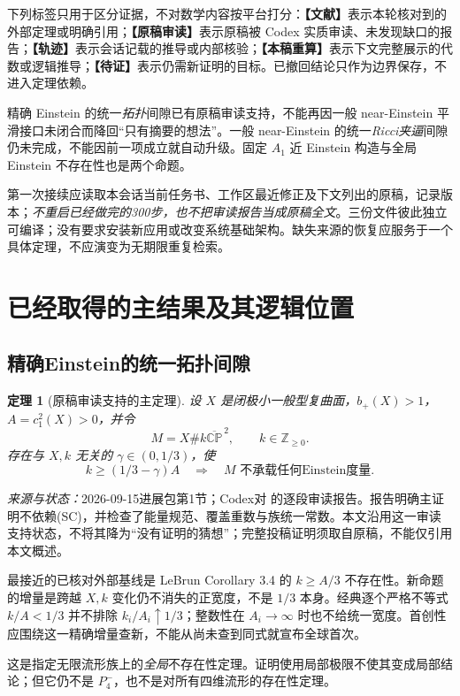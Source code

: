 \documentclass[UTF8,a4paper,11pt,fontset=fandol]{ctexart}
\numberwithin{equation}{section}
\newtheorem{theorem}{定理}[section]
\theoremstyle{definition}
\newcommand{\CP}{\mathbb{CP}}
\newcommand{\Z}{\mathbb Z}
\newcommand{\source}[1]{\par\noindent\textit{来源与状态：}#1\par}
\newcommand{\status}[1]{\textbf{【#1】}}
\begin{document}
下列标签只用于区分证据，不对数学内容按平台打分：\status{文献}表示本轮核对到的外部定理或明确引用；\status{原稿审读}表示原稿被 Codex 实质审读、未发现缺口的报告；\status{轨迹}表示会话记载的推导或内部核验；\status{本稿重算}表示下文完整展示的代数或逻辑推导；\status{待证}表示仍需新证明的目标。已撤回结论只作为边界保存，不进入定理依赖。

精确 Einstein 的统一\emph{拓扑}间隙已有原稿审读支持，不能再因一般 near-Einstein 平滑接口未闭合而降回“只有摘要的想法”。一般 near-Einstein 的统一\emph{Ricci夹逼}间隙仍未完成，不能因前一项成立就自动升级。固定 $A_1$ 近 Einstein 构造与全局 Einstein 不存在性也是两个命题。

第一次接续应读取本会话当前任务书、工作区最近修正及下文列出的原稿，记录版本；\emph{不重启已经做完的300步，也不把审读报告当成原稿全文}。三份文件彼此独立可编译；没有要求安装新应用或改变系统基础架构。缺失来源的恢复应服务于一个具体定理，不应演变为无期限重复检索。

\section{已经取得的主结果及其逻辑位置}
\subsection{精确Einstein的统一拓扑间隙}
\begin{theorem}[原稿审读支持的主定理]\label{thm:topgap}
设 $X$ 是闭极小一般型复曲面，$b_+(X)>1$，$A=c_1^2(X)>0$，并令
\[
M=X\#k\overline{\CP}^{\,2},\qquad k\in\Z_{\ge0}.
\]
存在与 $X,k$ 无关的 $\gamma\in(0,1/3)$，使
\begin{equation}\label{eq:topgap}
 k\ge(1/3-\gamma)A\quad\Longrightarrow\quad
 M\text{ 不承载任何Einstein度量}.
\end{equation}
\end{theorem}
\source{2026-09-15进展包第1节；Codex对  的逐段审读报告\cite{Project,CodexReview}。报告明确主证明不依赖(SC)，并检查了能量规范、覆盖重数与族统一常数。本文沿用这一审读支持状态，不将其降为“没有证明的猜想”；完整投稿证明须取自原稿，不能仅引用本文概述。}

最接近的已核对外部基线是 LeBrun Corollary 3.4 的 $k\ge A/3$ 不存在性\cite{LeBrun2001}。新命题的增量是跨越 $X,k$ 变化仍不消失的正宽度，不是 $1/3$ 本身。经典逐个严格不等式 $k/A<1/3$ 并不排除 $k_i/A_i\uparrow1/3$；整数性在 $A_i\to\infty$ 时也不给统一宽度。首创性应围绕这一精确增量查新，不能从尚未查到同式就宣布全球首次。

这是指定无限流形族上的\emph{全局}不存在性定理。证明使用局部极限不使其变成局部结论；但它仍不是 $P_4^-$，也不是对所有四维流形的存在性定理。
\end{document}
